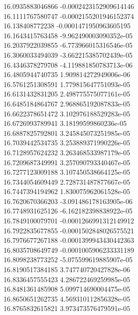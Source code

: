 {16.0935883046866 -0.0002423152909614146 \\
16.1111767580747 -0.0002155201946152374 \\
16.138408772238 -0.0001471950963605195 \\
16.1643415763458 -9.962490003090352e-05 \\
16.2037922039855 -6.773966015316546e-05 \\
16.3060033494039 -3.662215385702439e-05 \\
16.4346378279708 -4.119881850783713e-06 \\
16.4805944740735 1.909814272949006e-06 \\
16.5761251308591 1.779815647751093e-05 \\
16.6131432831205 2.498775575077161e-05 \\
16.6485184864767 2.968865192087833e-05 \\
16.6622378651472 3.102976188529283e-05 \\
16.6726993789941 3.18199599860236e-05 \\
16.6887825792801 3.245845073251985e-05 \\
16.7039442534735 3.253889371990226e-05 \\
16.7128957624232 3.263468533987179e-05 \\
16.7209687349991 3.257090793340467e-05 \\
16.7277123009188 3.107450538664125e-05 \\
16.7344054609449 2.728731487877667e-05 \\
16.7447394194962 1.830075962061528e-05 \\
16.7620670366203 -3.091486178163905e-06 \\
16.7748931625126 -6.162182398838922e-05 \\
16.7849100079701 -0.0001266991312149912 \\
16.7922835677855 -0.0001502848026575521 \\
16.7976677267188 -0.0001399943430442363 \\
16.8035708649749 -0.0001005906233331189 \\
16.8098238773252 -5.075599619885907e-05 \\
16.8190517384185 3.747740720427828e-06 \\
16.8336457555423 4.286722469259985e-05 \\
16.8481361485908 5.099714690004475e-05 \\
16.8650651262735 4.569310112856328e-05 \\
16.8765832615821 3.973473576479591e-05 \\
}
